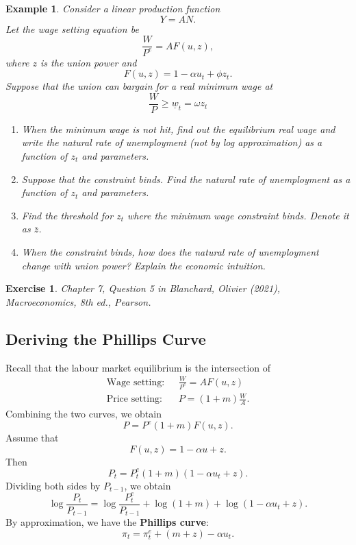 \documentclass[12pt]{article}
\newtheorem{example}{Example}
\newtheorem{exercise}{Exercise}
\begin{document}
\begin{example}
    Consider a linear production function
    \[Y = AN.\]
    Let the wage setting equation be
    \[\frac{W}{P^e} = A F(u,z),\]
    where $z$ is the union power and
    \[F(u,z) = 1 - \alpha u_t + \phi z_t.\]
    Suppose that the union can bargain for a real minimum wage at
    \[\frac{W}{P}\geq\underline{w}_t = \omega z_t\]
    \begin{enumerate}[label=(\arabic*)]
        \item When the minimum wage is not hit, find out the equilibrium real wage and write the natural rate of unemployment (not by log approximation) as a function of $z_t$ and parameters.
        \vspace{60pt}
        \item Suppose that the constraint binds. Find the natural rate of unemployment as a function of $z_t$ and parameters.
        \vspace{60pt}
        \item Find the threshold for $z_t$ where the minimum wage constraint binds. Denote it as $\bar{z}$.
        \vspace{60pt}
        \item When the constraint binds, how does the natural rate of unemployment change with union power? Explain the economic intuition.
        \vspace{60pt}
    \end{enumerate}
\end{example}



\begin{exercise}
    Chapter 7, Question 5 in Blanchard, Olivier (2021), \textit{Macroeconomics}, 8th ed., Pearson.
\end{exercise}

\subsection*{Deriving the Phillips Curve}
Recall that the labour market equilibrium is the intersection of
\begin{align*}
    \text{Wage setting: }\,\,&\frac{W}{P^e} = AF(u,z)\\
    \text{Price setting: }\,\,&P = (1+m)\frac{W}{A}.
\end{align*}
Combining the two curves, we obtain
\[P = P^e(1+m) F(u,z).\]
Assume that
\[F(u,z) = 1-\alpha u +z.\]
Then
\[P_t = P^e_t(1+m) (1-\alpha u_t +z).\]
Dividing both sides by $P_{t-1}$, we obtain
\[\log\frac{P_t}{P_{t-1}} = \log\frac{P^e_t}{P_{t-1}} + \log (1+m) + \log (1-\alpha u_t +z).\]
By approximation, we have the \textbf{Phillips curve}:
\[\pi_t = \pi^e_t + (m+z) - \alpha u_t.\]
\end{document}
